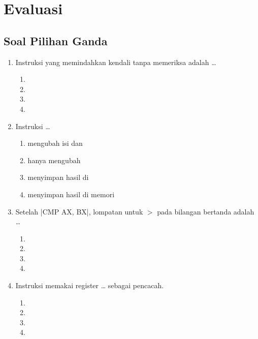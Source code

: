 \section{Evaluasi}
\label{sec:evaluasi-bab13}

\subsection{Soal Pilihan Ganda}

\begin{enumerate}
    \item Instruksi yang memindahkan kendali tanpa memeriksa
           adalah \dots
          \begin{enumerate}
              \item {} \item {}
              \item {} \item {}
          \end{enumerate}

    \item Instruksi  \dots
          \begin{enumerate}
              \item mengubah isi  dan 
              \item hanya mengubah 
              \item menyimpan hasil di 
              \item menyimpan hasil di memori
          \end{enumerate}

    \item Setelah \lstasm|CMP AX, BX|, lompatan untuk
           $>$  pada bilangan bertanda adalah
          \dots
          \begin{enumerate}
              \item {} \item {}
              \item {} \item {}
          \end{enumerate}

    \item Instruksi  memakai register \dots{} sebagai
          pencacah.
          \begin{enumerate}
              \item {} \item {}
              \item {} \item {}
          \end{enumerate}


\end{enumerate}
